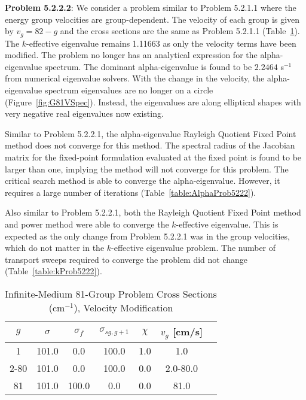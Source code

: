 \textbf{Problem 5.2.2.2}: We consider a problem similar to Problem 5.2.1.1 where the energy group velocities are group-dependent. The velocity of each group is given by $v_{g} = 82 - g$ and the cross sections are the same as Problem 5.2.1.1 (Table~\ref{table:G81v}). The $k$-effective eigenvalue remains 1.11663 as only the velocity terms have been modified. The problem no longer has an analytical expression for the alpha-eigenvalue spectrum. The dominant alpha-eigenvalue is found to be $2.2464$ s$^{-1}$ from numerical eigenvalue solvers. With the change in the velocity, the alpha-eigenvalue spectrum eigenvalues are no longer on a circle (Figure~\ref{fig:G81VSpec}). Instead, the eigenvalues are along elliptical shapes with very negative real eigenvalues now existing. 


Similar to Problem 5.2.2.1, the alpha-eigenvalue Rayleigh Quotient Fixed Point method does not converge for this method. The spectral radius of the Jacobian matrix for the fixed-point formulation evaluated at the fixed point is found to be larger than one, implying the method will not converge for this problem. The critical search method is able to converge the alpha-eigenvalue. However, it requires a large number of iterations (Table~\ref{table:AlphaProb5222}).

Also similar to Problem 5.2.2.1, both the Rayleigh Quotient Fixed Point method and power method were able to converge the $k$-effective eigenvalue. This is expected as the only change from Problem 5.2.2.1 was in the group velocities, which do not matter in the $k$-effective eigenvalue problem. The number of transport sweeps required to converge the problem did not change (Table~\ref{table:kProb5222}).

\begin{table}[!htbp]
    \centering
    \caption{Infinite-Medium 81-Group Problem Cross Sections (cm$^{-1}$), Velocity Modification}
\label{table:G81v}
    \begin{tabular}{*7c}
        \toprule
	$g$ & $\sigma$ & $\sigma_{f}$ & $\sigma_{sg,g+1}$ & $\chi$ & $v_{g}$ [cm/s] \\ 
        \midrule
	1 & 101.0 & 0.0 & 100.0 & 1.0 & 1.0 \\
	2-80 & 101.0 & 0.0 & 100.0 & 0.0 & 2.0-80.0 \\
	81 & 101.0 & 100.0 & 0.0 & 0.0 & 81.0 \\
        \bottomrule
    \end{tabular}
\end{table}

